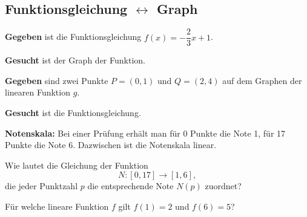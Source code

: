 \subsection{Funktionsgleichung $\leftrightarrow$ Graph}
\begin{example}
    \textbf{Gegeben} ist die Funktionsgleichung $f(x) = -\dfrac{2}{3}x + 1$.

    \textbf{Gesucht} ist der Graph der Funktion.
\end{example}

\begin{example}
    \textbf{Gegeben} sind zwei Punkte $P = (0,1)$ und $Q = (2,4)$ auf dem Graphen der linearen Funktion $g$.

    \textbf{Gesucht} ist die Funktionsgleichung.
\end{example}
\newpage

\begin{example}
    \textbf{Notenskala:} Bei einer Prüfung erhält man für 0 Punkte die Note 1, für 17 Punkte die Note 6. Dazwischen ist die Notenskala linear.

    Wie lautet die Gleichung der Funktion
    \[N: [0,17] \to [1,6],\]
    die jeder Punktzahl $p$ die entsprechende Note $N(p)$ zuordnet?
\end{example}
\newpage

\begin{example}
    Für welche lineare Funktion $f$ gilt $f(1) = 2$ und $f(6) = 5$?
\end{example}
\newpage

